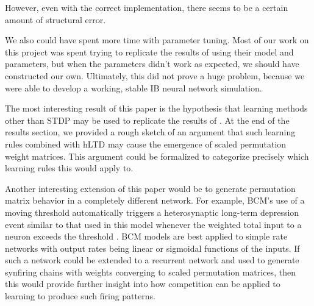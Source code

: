 However, even with the correct implementation, there seems to be a certain amount of structural error.

We also could have spent more time with parameter tuning. Most of our work on this project was spent trying to replicate the results of \cite{Fiete} using their model and parameters, but when the parameters didn't work as expected, we should have constructed our own. Ultimately, this did not prove a huge problem, because we were able to develop a working, stable IB neural network simulation.

The most interesting result of this paper is the hypothesis that learning methods other than STDP may be used to replicate the results of \cite{Fiete}. At the end of the results section, we provided a rough sketch of an argument that such learning rules combined with hLTD may cause the emergence of scaled permutation weight matrices. This argument could be formalized to categorize precisely which learning rules this would apply to.

Another interesting extension of this paper would be to generate permutation matrix behavior in a completely different network. For example, BCM's use of a moving threshold automatically triggers a heterosynaptic long-term depression event similar to that used in this model whenever the weighted total input to a neuron exceeds the threshold \cite{BCM}. BCM models are best applied to simple rate networks with output rates being linear or sigmoidal functions of the inputs. If such a network could be extended to a recurrent network and used to generate synfiring chains with weights converging to scaled permutation matrices, then this would provide further insight into how competition can be applied to learning to produce such firing patterns.